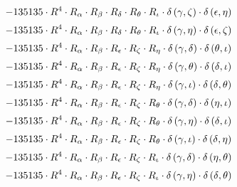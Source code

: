 \begin{subequations}
\begin{gather}
 \\[0.2em] \notag 		 - 135135 \cdot R^{4} \cdot R_{\alpha{}} \cdot R_{\beta{}} \cdot R_{\delta{}} \cdot R_{\theta{}} \cdot R_{\iota{}} \cdot \delta{}\left(\gamma{}, \zeta{}\right) \cdot \delta{}\left(\epsilon{}, \eta{}\right) 
 \\[0.2em] \notag 		 - 135135 \cdot R^{4} \cdot R_{\alpha{}} \cdot R_{\beta{}} \cdot R_{\delta{}} \cdot R_{\theta{}} \cdot R_{\iota{}} \cdot \delta{}\left(\gamma{}, \eta{}\right) \cdot \delta{}\left(\epsilon{}, \zeta{}\right) 
 \\[0.2em] \notag 		 - 135135 \cdot R^{4} \cdot R_{\alpha{}} \cdot R_{\beta{}} \cdot R_{\epsilon{}} \cdot R_{\zeta{}} \cdot R_{\eta{}} \cdot \delta{}\left(\gamma{}, \delta{}\right) \cdot \delta{}\left(\theta{}, \iota{}\right) 
 \\[0.2em] \notag 		 - 135135 \cdot R^{4} \cdot R_{\alpha{}} \cdot R_{\beta{}} \cdot R_{\epsilon{}} \cdot R_{\zeta{}} \cdot R_{\eta{}} \cdot \delta{}\left(\gamma{}, \theta{}\right) \cdot \delta{}\left(\delta{}, \iota{}\right) 
 \\[0.2em] \notag 		 - 135135 \cdot R^{4} \cdot R_{\alpha{}} \cdot R_{\beta{}} \cdot R_{\epsilon{}} \cdot R_{\zeta{}} \cdot R_{\eta{}} \cdot \delta{}\left(\gamma{}, \iota{}\right) \cdot \delta{}\left(\delta{}, \theta{}\right) 
 \\[0.2em] \notag 		 - 135135 \cdot R^{4} \cdot R_{\alpha{}} \cdot R_{\beta{}} \cdot R_{\epsilon{}} \cdot R_{\zeta{}} \cdot R_{\theta{}} \cdot \delta{}\left(\gamma{}, \delta{}\right) \cdot \delta{}\left(\eta{}, \iota{}\right) 
 \\[0.2em] \notag 		 - 135135 \cdot R^{4} \cdot R_{\alpha{}} \cdot R_{\beta{}} \cdot R_{\epsilon{}} \cdot R_{\zeta{}} \cdot R_{\theta{}} \cdot \delta{}\left(\gamma{}, \eta{}\right) \cdot \delta{}\left(\delta{}, \iota{}\right) 
 \\[0.2em] \notag 		 - 135135 \cdot R^{4} \cdot R_{\alpha{}} \cdot R_{\beta{}} \cdot R_{\epsilon{}} \cdot R_{\zeta{}} \cdot R_{\theta{}} \cdot \delta{}\left(\gamma{}, \iota{}\right) \cdot \delta{}\left(\delta{}, \eta{}\right) 
 \\[0.2em] \notag 		 - 135135 \cdot R^{4} \cdot R_{\alpha{}} \cdot R_{\beta{}} \cdot R_{\epsilon{}} \cdot R_{\zeta{}} \cdot R_{\iota{}} \cdot \delta{}\left(\gamma{}, \delta{}\right) \cdot \delta{}\left(\eta{}, \theta{}\right) 
 \\[0.2em] \notag 		 - 135135 \cdot R^{4} \cdot R_{\alpha{}} \cdot R_{\beta{}} \cdot R_{\epsilon{}} \cdot R_{\zeta{}} \cdot R_{\iota{}} \cdot \delta{}\left(\gamma{}, \eta{}\right) \cdot \delta{}\left(\delta{}, \theta{}\right) 

\end{gather}
\end{subequations}
